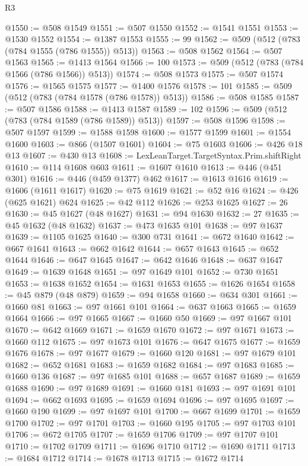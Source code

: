 \begin{lexlean}{R3}
\begin{coremodule}
@1550 := @508 @1549
@1551 := @507 @1550
@1552 := @1541 @1551
@1553 := @1530 @1552
@1554 := @1387 @1553
@1555 := 99
@1562 := @509 (@512 (@783 (@784 @1555 (@786 @1555)) @513))
@1563 := @508 @1562
@1564 := @507 @1563
@1565 := @1413 @1564
@1566 := 100
@1573 := @509 (@512 (@783 (@784 @1566 (@786 @1566)) @513))
@1574 := @508 @1573
@1575 := @507 @1574
@1576 := @1565 @1575
@1577 := @1400 @1576
@1578 := 101
@1585 := @509 (@512 (@783 (@784 @1578 (@786 @1578)) @513))
@1586 := @508 @1585
@1587 := @507 @1586
@1588 := @1413 @1587
@1589 := 102
@1596 := @509 (@512 (@783 (@784 @1589 (@786 @1589)) @513))
@1597 := @508 @1596
@1598 := @507 @1597
@1599 := @1588 @1598
@1600 := @1577 @1599
@1601 := @1554 @1600
@1603 := @866 (@1507 @1601)
@1604 := @75 @1603
@1606 := @426 @18 @13
@1607 := @430 @13
@1608 := LexLeanTarget.TargetSyntax.Prim.shiftRight
@1610 := @114 @1608 @603
@1611 := @1607 @1610
@1613 := @446 (@451 @301)
@1616 := @446 (@459 @1377) @462
@1617 := @1613 @1616
@1619 := @1606 (@1611 @1617)
@1620 := @75 @1619
@1621 := @52 @16
@1624 := @426 (@625 @1621) @624
@1625 := @42 @112
@1626 := @253 @1625
@1627 := 26
@1630 := @45 @1627 (@48 @1627)
@1631 := @94 @1630
@1632 := 27
@1635 := @45 @1632 (@48 @1632)
@1637 := @473 @1635 @101
@1638 := @97 @1637
@1639 := @1105 @1625
@1640 := @300 @731
@1641 := @672 @1640
@1642 := @667 @1641
@1643 := @662 @1642
@1644 := @657 @1643
@1645 := @652 @1644
@1646 := @647 @1645
@1647 := @642 @1646
@1648 := @637 @1647
@1649 := @1639 @1648
@1651 := @97 @1649 @101
@1652 := @730 @1651
@1653 := @1638 @1652
@1654 := @1631 @1653
@1655 := @1626 @1654
@1658 := @45 @879 (@48 @879)
@1659 := @94 @1658
@1660 := @634 @301
@1661 := @1660 @81
@1663 := @97 @1661 @101
@1664 := @637 @1663
@1665 := @1659 @1664
@1666 := @97 @1665
@1667 := @1660 @50
@1669 := @97 @1667 @101
@1670 := @642 @1669
@1671 := @1659 @1670
@1672 := @97 @1671
@1673 := @1660 @112
@1675 := @97 @1673 @101
@1676 := @647 @1675
@1677 := @1659 @1676
@1678 := @97 @1677
@1679 := @1660 @120
@1681 := @97 @1679 @101
@1682 := @652 @1681
@1683 := @1659 @1682
@1684 := @97 @1683
@1685 := @1660 @136
@1687 := @97 @1685 @101
@1688 := @657 @1687
@1689 := @1659 @1688
@1690 := @97 @1689
@1691 := @1660 @181
@1693 := @97 @1691 @101
@1694 := @662 @1693
@1695 := @1659 @1694
@1696 := @97 @1695
@1697 := @1660 @190
@1699 := @97 @1697 @101
@1700 := @667 @1699
@1701 := @1659 @1700
@1702 := @97 @1701
@1703 := @1660 @195
@1705 := @97 @1703 @101
@1706 := @672 @1705
@1707 := @1659 @1706
@1709 := @97 @1707 @101
@1710 := @1702 @1709
@1711 := @1696 @1710
@1712 := @1690 @1711
@1713 := @1684 @1712
@1714 := @1678 @1713
@1715 := @1672 @1714

\end{coremodule}
\end{lexlean}
